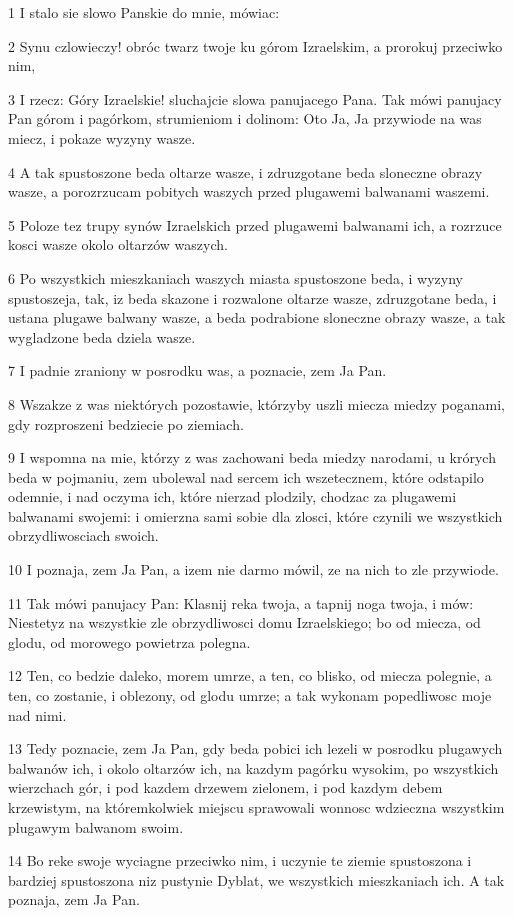 \par 1 I stalo sie slowo Panskie do mnie, mówiac:
\par 2 Synu czlowieczy! obróc twarz twoje ku górom Izraelskim, a prorokuj przeciwko nim,
\par 3 I rzecz: Góry Izraelskie! sluchajcie slowa panujacego Pana. Tak mówi panujacy Pan górom i pagórkom, strumieniom i dolinom: Oto Ja, Ja przywiode na was miecz, i pokaze wyzyny wasze.
\par 4 A tak spustoszone beda oltarze wasze, i zdruzgotane beda sloneczne obrazy wasze, a porozrzucam pobitych waszych przed plugawemi balwanami waszemi.
\par 5 Poloze tez trupy synów Izraelskich przed plugawemi balwanami ich, a rozrzuce kosci wasze okolo oltarzów waszych.
\par 6 Po wszystkich mieszkaniach waszych miasta spustoszone beda, i wyzyny spustoszeja, tak, iz beda skazone i rozwalone oltarze wasze, zdruzgotane beda, i ustana plugawe balwany wasze, a beda podrabione sloneczne obrazy wasze, a tak wygladzone beda dziela wasze.
\par 7 I padnie zraniony w posrodku was, a poznacie, zem Ja Pan.
\par 8 Wszakze z was niektórych pozostawie, którzyby uszli miecza miedzy poganami, gdy rozproszeni bedziecie po ziemiach.
\par 9 I wspomna na mie, którzy z was zachowani beda miedzy narodami, u krórych beda w pojmaniu, zem ubolewal nad sercem ich wszetecznem, które odstapilo odemnie, i nad oczyma ich, które nierzad plodzily, chodzac za plugawemi balwanami swojemi: i omierzna sami sobie dla zlosci, które czynili we wszystkich obrzydliwosciach swoich.
\par 10 I poznaja, zem Ja Pan, a izem nie darmo mówil, ze na nich to zle przywiode.
\par 11 Tak mówi panujacy Pan: Klasnij reka twoja, a tapnij noga twoja, i mów: Niestetyz na wszystkie zle obrzydliwosci domu Izraelskiego; bo od miecza, od glodu, od morowego powietrza polegna.
\par 12 Ten, co bedzie daleko, morem umrze, a ten, co blisko, od miecza polegnie, a ten, co zostanie, i oblezony, od glodu umrze; a tak wykonam popedliwosc moje nad nimi.
\par 13 Tedy poznacie, zem Ja Pan, gdy beda pobici ich lezeli w posrodku plugawych balwanów ich, i okolo oltarzów ich, na kazdym pagórku wysokim, po wszystkich wierzchach gór, i pod kazdem drzewem zielonem, i pod kazdym debem krzewistym, na któremkolwiek miejscu sprawowali wonnosc wdzieczna wszystkim plugawym balwanom swoim.
\par 14 Bo reke swoje wyciagne przeciwko nim, i uczynie te ziemie spustoszona i bardziej spustoszona niz pustynie Dyblat, we wszystkich mieszkaniach ich. A tak poznaja, zem Ja Pan.

